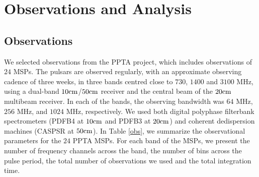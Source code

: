 \documentclass[useAMS,usenatbib]{mn2e}
\begin{document}
\section{Observations and Analysis}

\subsection{Observations}

We selected observations from the PPTA project, which includes observations 
of $24$ MSPs. 
%
The pulsars are observed regularly, with an approximate observing cadence of 
three weeks, in three bands centred close to $730$, $1400$ and $3100$ MHz, 
using a dual-band $10\rm{cm}$/$50\rm{cm}$ receiver and the central beam 
of the $20\rm{cm}$ multibeam receiver. In each of the bands, the observing 
bandwidth was $64$ MHz, $256$ MHz, and $1024$ MHz, respectively. 
%
We used both digital polyphase filterbank spectrometers (PDFB4 at $10\rm{cm}$ 
and PDFB3 at $20\rm{cm}$) and coherent dedispersion machines (CASPSR at $50\rm{cm}$). 
%
In Table \ref{obs}, we summarize the observational parameters for the $24$ PPTA MSPs. 
%
For each band of the MSPs, we present the number of frequency channels across 
the band, the number of bins across the pulse period, the total number 
of observations we used and the total integration time.
%
%
\end{document}
